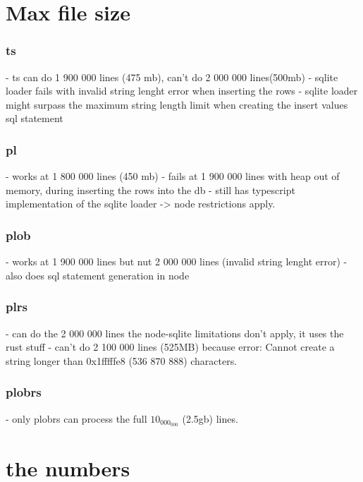 \section{Max file size}
\subsubsection{ts}
- ts can do 1 900 000 lines (475 mb), can't do 2 000 000 lines(500mb)
- sqlite loader fails with invalid string lenght error when inserting the rows
- sqlite loader might surpass the maximum string length limit when creating the insert values sql statement

\subsubsection{pl}
- works at 1 800 000 lines (450 mb)
- fails at 1 900 000 lines with heap out of memory, during inserting the rows into the db
- still has typescript implementation of the sqlite loader -> node restrictions apply.

\subsubsection{plob}
- works at 1 900 000 lines but nut 2 000 000 lines (invalid string lenght error)
- also does sql statement generation in node

\subsubsection{plrs}
- can do the 2 000 000 lines the node-sqlite limitations don't apply, it uses the rust stuff
- can't do 2 100 000 lines (525MB) because error: Cannot create a string longer than 0x1fffffe8 (536 870 888) characters.

\subsubsection{plobrs}
- only plobrs can process the full $10_000_000$ (2.5gb) lines.

\section{the numbers}




